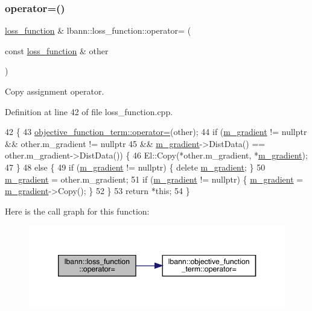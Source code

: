 \subsubsection{\texorpdfstring{operator=()}{operator=()}}
{\footnotesize\ttfamily \hyperlink{classlbann_1_1loss__function}{loss\+\_\+function} \& lbann\+::loss\+\_\+function\+::operator= (\begin{DoxyParamCaption}\item[{const \hyperlink{classlbann_1_1loss__function}{loss\+\_\+function} \&}]{other }\end{DoxyParamCaption})}

Copy assignment operator. 

Definition at line 42 of file loss\+\_\+function.\+cpp.


\begin{DoxyCode}
42                                                                   \{
43   \hyperlink{classlbann_1_1objective__function__term_a8bbac194d96a854d5841817b67b63334}{objective\_function\_term::operator=}(other);
44   \textcolor{keywordflow}{if} (\hyperlink{classlbann_1_1loss__function_ac6ac9f8f2cef7a4daa1b282dba914975}{m\_gradient} != \textcolor{keyword}{nullptr} && other.m\_gradient != \textcolor{keyword}{nullptr}
45       && \hyperlink{classlbann_1_1loss__function_ac6ac9f8f2cef7a4daa1b282dba914975}{m\_gradient}->DistData() == other.m\_gradient->DistData()) \{
46     El::Copy(*other.m\_gradient, *\hyperlink{classlbann_1_1loss__function_ac6ac9f8f2cef7a4daa1b282dba914975}{m\_gradient});
47   \}
48   \textcolor{keywordflow}{else} \{
49     \textcolor{keywordflow}{if} (\hyperlink{classlbann_1_1loss__function_ac6ac9f8f2cef7a4daa1b282dba914975}{m\_gradient} != \textcolor{keyword}{nullptr}) \{ \textcolor{keyword}{delete} \hyperlink{classlbann_1_1loss__function_ac6ac9f8f2cef7a4daa1b282dba914975}{m\_gradient}; \}
50     \hyperlink{classlbann_1_1loss__function_ac6ac9f8f2cef7a4daa1b282dba914975}{m\_gradient} = other.m\_gradient;
51     \textcolor{keywordflow}{if} (\hyperlink{classlbann_1_1loss__function_ac6ac9f8f2cef7a4daa1b282dba914975}{m\_gradient} != \textcolor{keyword}{nullptr}) \{ \hyperlink{classlbann_1_1loss__function_ac6ac9f8f2cef7a4daa1b282dba914975}{m\_gradient} = \hyperlink{classlbann_1_1loss__function_ac6ac9f8f2cef7a4daa1b282dba914975}{m\_gradient}->Copy(); \}
52   \}
53   \textcolor{keywordflow}{return} *\textcolor{keyword}{this};
54 \}
\end{DoxyCode}
Here is the call graph for this function\+:\nopagebreak
\begin{figure}[H]
\begin{center}
\leavevmode
\includegraphics[width=346pt]{classlbann_1_1loss__function_ab882c642619ea4285b61e735d84e401c_cgraph}
\end{center}
\end{figure}
